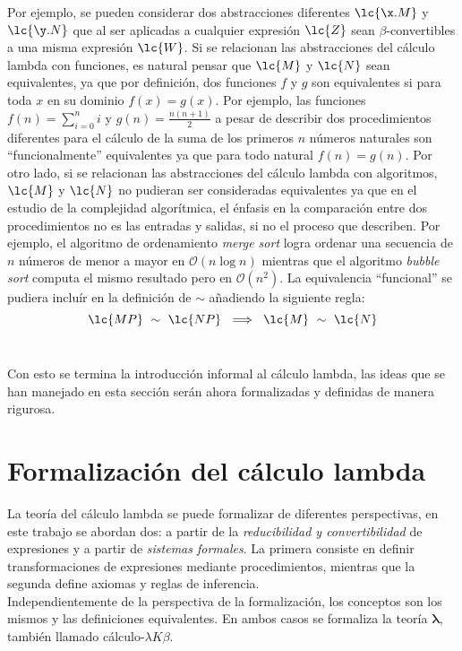 Por ejemplo, se pueden considerar dos abstracciones diferentes \(\lc{\x.M}\) y \(\lc{\y.N}\) que al ser aplicadas a cualquier expresión \(\lc{Z}\) sean \(\beta\)-convertibles a una misma expresión \(\lc{W}\). Si se relacionan las abstracciones del cálculo lambda con funciones, es natural pensar que \(\lc{M}\) y \(\lc{N}\) sean equivalentes, ya que por definición, dos funciones \(f\) y \(g\) son equivalentes si para toda \(x\) en su dominio \(f(x)=g(x)\). Por ejemplo, las funciones \(f(n)=\sum_{i=0}^{n}i\) y \(g(n)=\frac{n(n+1)}{2}\) a pesar de describir dos procedimientos diferentes para el cálculo de la suma de los primeros \(n\) números naturales son ``funcionalmente'' equivalentes ya que para todo natural \(f(n)=g(n)\). Por otro lado, si se relacionan las abstracciones del cálculo lambda con algoritmos, \(\lc{M}\) y \(\lc{N}\) no pudieran ser consideradas equivalentes ya que en el estudio de la complejidad algorítmica, el énfasis en la comparación entre dos procedimientos no es las entradas y salidas, si no el proceso que describen. Por ejemplo, el algoritmo de ordenamiento \emph{merge sort} logra ordenar una secuencia de \(n\) números de menor a mayor en \(\mathcal{O}(n \log n)\) mientras que el algoritmo \emph{bubble sort} computa el mismo resultado pero en \(\mathcal{O}(n^2)\).  La equivalencia ``funcional'' se pudiera incluír en la definición de \(\sim\) añadiendo la siguiente regla: \\

\[\lc{M P}\ \sim\ \lc{N P}\ \implies\ \lc{M}\ \sim\ \lc{N}\] \

Con esto se termina la introducción informal al cálculo lambda, las ideas que se han manejado en esta sección serán ahora formalizadas y definidas de manera rigurosa. \\

\section{Formalización del cálculo lambda}

La teoría del cálculo lambda se puede formalizar de diferentes perspectivas, en este trabajo se abordan dos: a partir de la \emph{reducibilidad y convertibilidad} de expresiones y a partir de \emph{sistemas formales}. La primera consiste en definir transformaciones de expresiones mediante procedimientos, mientras que la segunda define axiomas y reglas de inferencia. \\

Independientemente de la perspectiva de la formalización, los conceptos son los mismos y las definiciones equivalentes. En ambos casos se formaliza la teoría \(\boldsymbol{\lambda}\), también llamado cálculo-\(\lambda K \beta\). \\

